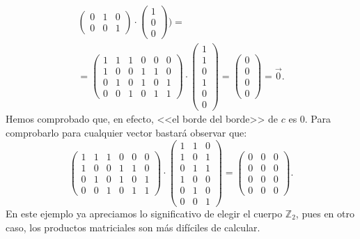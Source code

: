 \documentclass[12pt, a4paper, twoside]{book}
\numberwithin{equation}{section}
\theoremstyle{definition}
\newenvironment{ejem}
  {\pushQED{\qed}\renewcommand{\qedsymbol}{$\blacktriangleleft$}\ejemplo}
  {\popQED\endejemplo}
\theoremstyle{remark}
\theoremstyle{plain}
\begin{document}
\begin{ejem}
\begin{equation*}
\begin{split}
\begin{pmatrix}
				0 & 1 & 0 \\
				0 & 0 & 1
				\end{pmatrix}
				\cdot
				\begin{pmatrix}
				1 \\
				0 \\
				0 
				\end{pmatrix} \Bigg ) = \\
				=\begin{pmatrix}
				1 & 1 & 1 & 0 & 0 &0 \\
				1 & 0 & 0 & 1 & 1 &0 \\
				0 & 1 & 0 & 1 & 0 &1 \\
				0 & 0 & 1 & 0 & 1 &1
				\end{pmatrix}
				\cdot
				\begin{pmatrix}
				1 \\
				1 \\
				0 \\
				1 \\
				0 \\
				0
				\end{pmatrix} =
				\begin{pmatrix}
                                0 \\
				0 \\
				0 \\
				0
				\end{pmatrix}=
				\vec{0}.
			\end{split}
		\end{equation*}
		Hemos comprobado que, en efecto, <<el borde del borde>> de 
		$c$ es 0. Para comprobarlo para cualquier vector bastará 
		observar que:
		\begin{equation*}
		\begin{pmatrix}
				1 & 1 & 1 & 0 & 0 &0 \\
				1 & 0 & 0 & 1 & 1 &0 \\
				0 & 1 & 0 & 1 & 0 &1 \\
				0 & 0 & 1 & 0 & 1 &1
			\end{pmatrix}\cdot 
				\begin{pmatrix}
				1 & 1 & 0 \\
				1 & 0 & 1 \\
				0 & 1 & 1 \\
				1 & 0 & 0 \\
				0 & 1 & 0 \\
				0 & 0 & 1
				\end{pmatrix}
				=
				\begin{pmatrix}
				0 & 0 & 0 \\
				0 & 0 & 0 \\
				0 & 0 & 0 \\
				0 & 0 & 0 
				\end{pmatrix}.
		\end{equation*}
		En este ejemplo ya apreciamos lo significativo de elegir el 
		cuerpo $\mathbb{Z}_{2}$, pues en otro caso, los productos 
		matriciales son más difíciles de calcular.
	\end{ejem}
\end{document}

